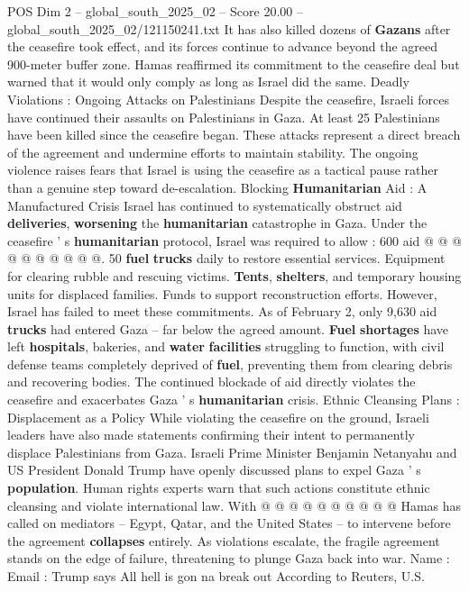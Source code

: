 \begin{textsample}{POS Dim 2 – global\_south\_2025\_02 – Score 20.00 – global\_south\_2025\_02/121150241.txt}
It has also killed dozens of \textbf{Gazans} after the ceasefire took effect, and its forces continue to advance beyond the agreed 900-meter buffer zone.
Hamas reaffirmed its commitment to the ceasefire deal but warned that it would only comply as long as Israel did the same.
Deadly Violations : Ongoing Attacks on Palestinians Despite the ceasefire, Israeli forces have continued their assaults on Palestinians in Gaza.
At least 25 Palestinians have been killed since the ceasefire began.
These attacks represent a direct breach of the agreement and undermine efforts to maintain stability.
The ongoing violence raises fears that Israel is using the ceasefire as a tactical pause rather than a genuine step toward de-escalation.
Blocking \textbf{Humanitarian} Aid : A Manufactured Crisis Israel has continued to systematically obstruct aid \textbf{deliveries}, \textbf{worsening} the \textbf{humanitarian} catastrophe in Gaza.
Under the ceasefire ' s \textbf{humanitarian} protocol, Israel was required to allow : 600 aid @ @ @ @ @ @ @ @ @ @. 50 \textbf{fuel} \textbf{trucks} daily to restore essential services.
Equipment for clearing rubble and rescuing victims. \textbf{Tents}, \textbf{shelters}, and temporary housing units for displaced families.
Funds to support reconstruction efforts.
However, Israel has failed to meet these commitments.
As of February 2, only 9,630 aid \textbf{trucks} had entered Gaza -- far below the agreed amount. \textbf{Fuel} \textbf{shortages} have left \textbf{hospitals}, bakeries, and \textbf{water} \textbf{facilities} struggling to function, with civil defense teams completely deprived of \textbf{fuel}, preventing them from clearing debris and recovering bodies.
The continued blockade of aid directly violates the ceasefire and exacerbates Gaza ' s \textbf{humanitarian} crisis.
Ethnic Cleansing Plans : Displacement as a Policy While violating the ceasefire on the ground, Israeli leaders have also made statements confirming their intent to permanently displace Palestinians from Gaza.
Israeli Prime Minister Benjamin Netanyahu and US President Donald Trump have openly discussed plans to expel Gaza ' s \textbf{population}.
Human rights experts warn that such actions constitute ethnic cleansing and violate international law.
With @ @ @ @ @ @ @ @ @ @ Hamas has called on mediators -- Egypt, Qatar, and the United States -- to intervene before the agreement \textbf{collapses} entirely.
As violations escalate, the fragile agreement stands on the edge of failure, threatening to plunge Gaza back into war.
Name : Email : Trump says All hell is gon na break out According to Reuters, U.S.

\end{textsample}

